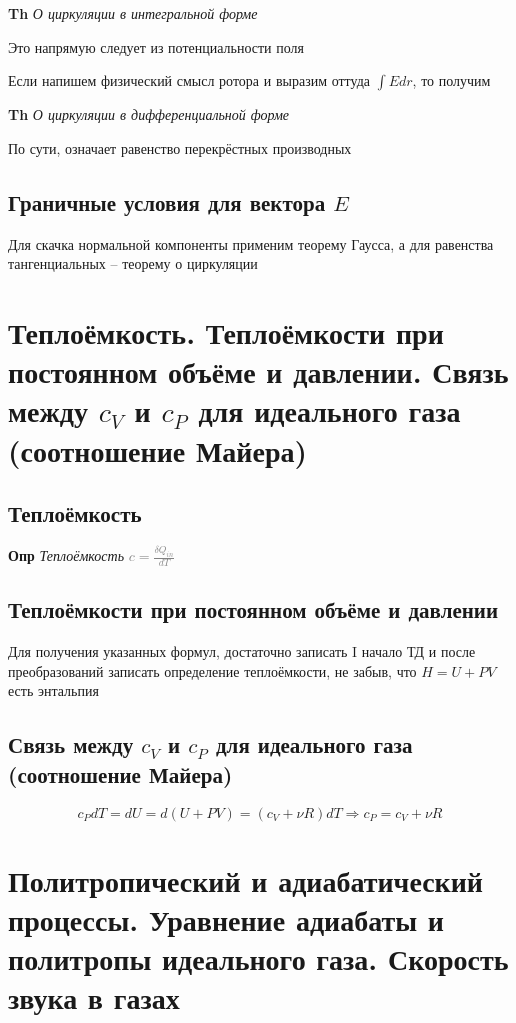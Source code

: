 \documentclass[a4paper, 14pt]{article}
\begin{document}
    \textbf{Th} \textit{О циркуляции в интегральной форме}
    
    Это напрямую следует из потенциальности поля
    
    Если напишем физический смысл ротора и выразим оттуда $\int Edr$, то получим
    
    \textbf{Th} \textit{О циркуляции в дифференциальной форме}
    
    По сути, означает равенство перекрёстных производных
    
    \subsection{Граничные условия для вектора $E$}
    
    Для скачка нормальной компоненты применим теорему Гаусса, а для равенства тангенциальных -- теорему о циркуляции
    
    \section{Теплоёмкость.
    Теплоёмкости при постоянном объёме и давлении.
    Связь между $c_V$ и $c_P$ для идеального газа (соотношение Майера)}
    
    \subsection{Теплоёмкость}
    
    \textbf{Опр} \textit{Теплоёмкость} \textcolor{gray}{$c = \frac{\delta Q_{in}}{dT}$}
    
    \subsection{Теплоёмкости при постоянном объёме и давлении}
    
    Для получения указанных формул, достаточно записать I начало ТД и после преобразований записать определение
    теплоёмкости, не забыв, что $H = U + PV$ есть энтальпия
    
    \subsection{Связь между $c_V$ и $c_P$ для идеального газа (соотношение Майера)}
    
    \[ c_P dT = dU = d(U + PV) = (c_V + \nu R) dT \Rightarrow c_P = c_V + \nu R\]
    
    \section{Политропический и адиабатический процессы.
    Уравнение адиабаты и политропы идеального газа.
    Скорость звука в газах}
    
\end{document}
